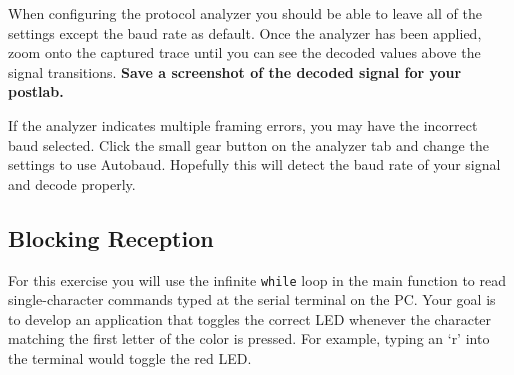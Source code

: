 \documentclass[openany,11pt,fleqn]{book} %
\begin{document}
When configuring the protocol analyzer you should be able to leave all of the settings except the baud rate as default. Once the analyzer has been applied, zoom onto the captured trace until you can see the decoded values above the signal transitions. \textbf{Save a screenshot of the decoded signal for your postlab. }

If the analyzer indicates multiple framing errors, you may have the incorrect baud selected. Click the small gear button on the analyzer tab and change the settings to use Autobaud. Hopefully this will detect the baud rate of your signal and decode properly. 



\subsection{Blocking Reception}

For this exercise you will use the infinite \texttt{while} loop in the main function to read single-character commands typed at the serial terminal on the PC. Your goal is to develop an application that toggles the correct LED whenever the character matching the first letter of the color is pressed. For example, typing an `r' into the terminal would toggle the red LED. 
\end{document}
